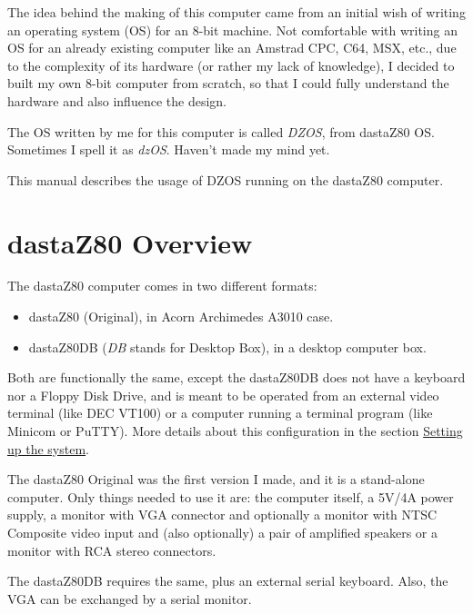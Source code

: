 \documentclass[a4paper,11pt]{article}
\begin{document}
    The idea behind the making of this computer came from an initial wish of
    writing an operating system (OS) for an 8-bit machine. Not comfortable with
    writing an OS for an already existing computer like an Amstrad CPC, C64,
    MSX, etc., due to the complexity of its hardware (or rather my lack of
    knowledge), I decided to built my own 8-bit computer from scratch, so that
    I could fully understand the hardware and also influence the design.

    The OS written by me for this computer is called \textit{DZOS}, from 
    dastaZ80 OS. Sometimes I spell it as \textit{dzOS}. Haven’t made my mind 
    yet.

    This manual describes the usage of DZOS running on the dastaZ80 computer.
    
    \pagebreak
    \section{dastaZ80 Overview}

    The dastaZ80 computer comes in two different formats:

    \begin{itemize}
        \item dastaZ80 (Original), in Acorn Archimedes A3010 case.
        \item dastaZ80DB (\textit{DB} stands for Desktop Box), in a desktop
            computer box.
    \end{itemize}

    Both are functionally the same, except the dastaZ80DB does not have a
    keyboard nor a Floppy Disk Drive, and is meant to be operated from an
    external video terminal (like DEC VT100) or a computer running a terminal
    program (like Minicom or PuTTY). More details about this configuration in
    the section \hyperref[sec:setting_system]{Setting up the system}.

    The dastaZ80 Original was the first version I made, and it is a stand-alone
    computer. Only things needed to use it are: the computer itself, a 5V/4A
    power supply, a monitor with VGA connector and optionally a monitor with 
    NTSC Composite video input and (also optionally) a pair of amplified
    speakers or a monitor with RCA stereo connectors.

    The dastaZ80DB requires the same, plus an external serial keyboard. Also,
    the VGA can be exchanged by a serial monitor.
\end{document}
